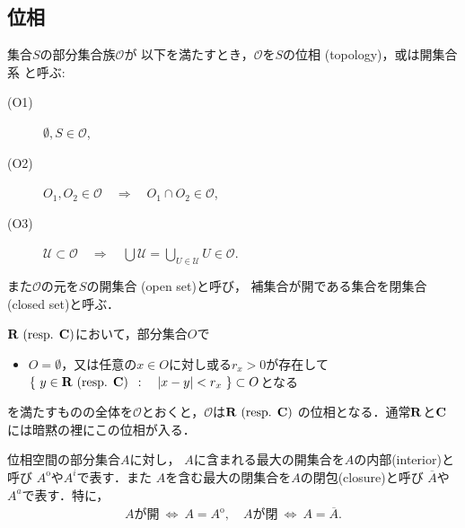 \subsection{位相}
	\begin{screen}
		\begin{dfn}[位相]
			集合$S$の部分集合族$\mathscr{O}$が
			以下を満たすとき，$\mathscr{O}$を$S$の位相
			(topology)，或は開集合系
			と呼ぶ:
			\begin{description}
				\item[(O1)] $\emptyset, S \in \mathscr{O}$,
				\item[(O2)] $O_1,O_2 \in \mathscr{O} 
					\quad \Longrightarrow \quad O_1 \cap O_2 \in \mathscr{O}$,
				\item[(O3)] $\displaystyle\mathscr{U} \subset \mathscr{O}
					\quad \Longrightarrow \quad \bigcup \mathscr{U} = 
					\bigcup_{U \in \mathscr{U}} U \in \mathscr{O}$.
			\end{description}
			また$\mathscr{O}$の元を$S$の開集合
			(open set)と呼び，
			補集合が開である集合を閉集合(closed set)と呼ぶ．
		\end{dfn}
	\end{screen}
	
	$\mathbf{R}\mbox{ (resp. $\mathbf{C}$)}$において，部分集合$O$で
	\begin{itemize}
		\item $O = \emptyset$，又は任意の$x \in O$に対し或る$r_x > 0$が存在して
			$\left\{\ y \in \mathbf{R} \mbox{ (resp. $\mathbf{C}$)}\ \, : \quad |x-y| < r_x\ \right\} \subset O$となる
	\end{itemize}
	を満たすものの全体を$\mathscr{O}$とおくと，$\mathscr{O}$は$\mathbf{R}\mbox{ (resp. $\mathbf{C}$)}$
	の位相となる．通常$\mathbf{R}$と$\mathbf{C}$には暗黙の裡にこの位相が入る．
	
	\begin{screen}
		\begin{dfn}[内部・閉包]
			位相空間の部分集合$A$に対し，
			$A$に含まれる最大の開集合を$A$の内部(interior)と呼び
			$A^{\mathrm{o}}$や$A^i$で表す．また
			$A$を含む最大の閉集合を$A$の閉包(closure)と呼び
			$\overline{A}$や$A^a$で表す．特に，
			\begin{align}
				\mbox{$A$が開}\ \Longleftrightarrow\ 
				A = A^\mathrm{o},
				\quad \mbox{$A$が閉}\ \Longleftrightarrow\ 
				A = \overline{A}.
				\label{eq:dfn_interior_closure}
			\end{align}
		\end{dfn}
	\end{screen}
	
